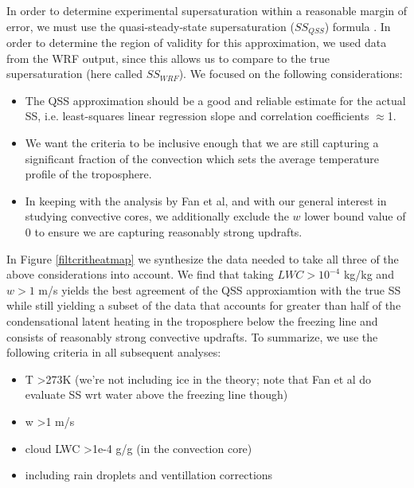 \documentclass{article}
\begin{document}
In order to determine experimental supersaturation within a reasonable margin of error, we must use the quasi-steady-state supersaturation ($SS_{QSS}$) formula \cite{Rogers1989}. In order to determine the region of validity for this approximation, we used data from the WRF output, since this allows us to compare to the true supersaturation (here called $SS_{WRF}$). We focused on the following considerations:
\begin{itemize}
\item The QSS approximation should be a good and reliable estimate for the actual SS, i.e. least-squares linear regression slope and correlation coefficients $\approx$1.  
\item We want the criteria to be inclusive enough that we are still capturing a significant fraction of the convection which sets the average temperature profile of the troposphere.
\item In keeping with the analysis by Fan et al, and with our general interest in studying convective cores, we additionally exclude the $w$ lower bound value of 0 to ensure we are capturing reasonably strong updrafts. 
\end{itemize}
In Figure \ref{filtcritheatmap} we synthesize the data needed to take all three of the above considerations into account. We find that taking $LWC > 10^{-4}$ kg/kg and $w>1$ m/s yields the best agreement of the QSS approxiamtion with the true SS while still yielding a subset of the data that accounts for greater than half of the condensational latent heating in the troposphere below the freezing line and consists of reasonably strong convective updrafts. To summarize, we use the following criteria in all subsequent analyses:
\begin{itemize}
	\item T \textgreater  273K (we're not including ice in the theory; note that Fan et al do evaluate SS wrt water above the freezing line though)
	\item w \textgreater  1 m/s
	\item cloud LWC \textgreater  1e-4 g/g (in the convection core) 
	\item including rain droplets and ventillation corrections
\end{itemize}
\end{document}
